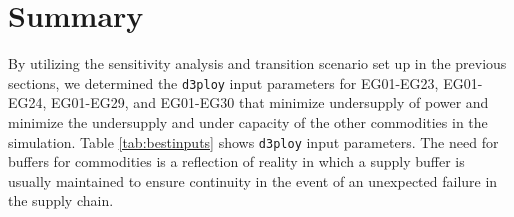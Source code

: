 \documentclass[11pt]{article}
\newcommand{\deploy}{\texttt{d3ploy}\xspace}%
\begin{document}
\section{Summary}
By utilizing the sensitivity analysis and transition scenario set up in the previous 
sections, we determined the \deploy input parameters for EG01-EG23, EG01-EG24, EG01-EG29, 
and EG01-EG30 that minimize undersupply of power and minimize 
the undersupply and under capacity of the other commodities
in the simulation. 
Table \ref{tab:bestinputs} shows \deploy input parameters. 
The need for buffers for commodities is a reflection of reality
in which a supply buffer is usually maintained to ensure 
continuity in the event of an unexpected failure in the supply chain.

\begin{table}[]
\end{table}
\end{document}
